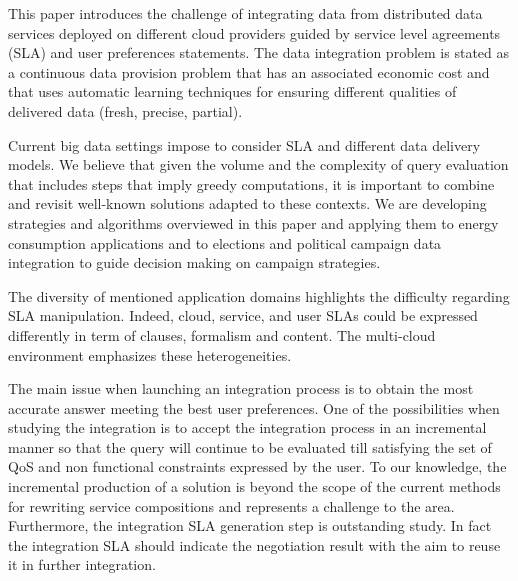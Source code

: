 This paper introduces the challenge of integrating data from distributed data services deployed on different cloud providers guided by service level agreements (SLA) and user preferences statements. The data integration problem is stated as a continuous data provision problem that has an associated economic cost and that uses automatic learning techniques for ensuring different qualities of delivered data (fresh, precise, partial).



Current big data settings impose  to consider SLA and different data delivery models. We believe that given the volume and the complexity of query evaluation that includes steps that imply greedy computations, it is important to combine and revisit well-known solutions  adapted to these contexts. We are  developing  strategies and algorithms overviewed in this paper and applying them to energy consumption applications and to elections and political campaign data integration to guide decision making on campaign strategies.

The diversity of mentioned application domains highlights the difficulty regarding SLA manipulation. Indeed, cloud, service, and user SLAs could be expressed differently in term of clauses, formalism and content. The multi-cloud environment emphasizes these heterogeneities. 

 
The main issue when launching an integration process is to obtain the most accurate answer meeting the best user preferences. One of the possibilities when studying the integration is to accept the integration process in an incremental  manner so that the query will continue to be evaluated till satisfying the set of QoS and non functional constraints expressed by the user. To our knowledge, the incremental production of a solution is beyond  the scope of the current methods for rewriting service compositions and represents a challenge to the area.
Furthermore, the integration SLA generation step is outstanding study. In fact the integration SLA should indicate the negotiation result with the aim to reuse it in further integration.


% 
%
%
%

